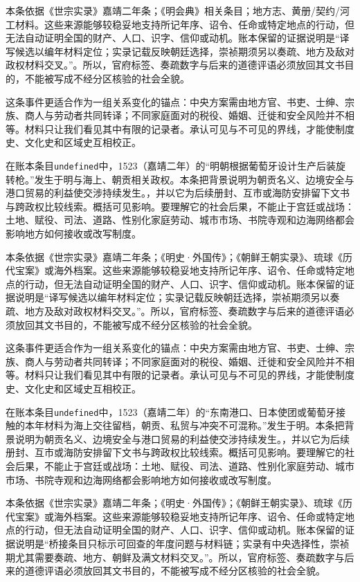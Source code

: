 本条依据《世宗实录》嘉靖二年条；《明会典》相关条目；地方志、黄册/契约/河工材料。这些来源能够较稳妥地支持所记年序、诏令、任命或特定地点的行动，但无法自动证明全国的财产、人口、识字、信仰或动机。账本保留的证据说明是“译写候选以编年材料定位；实录记载反映朝廷选择，崇祯期须另以奏疏、地方及敌对政权材料交叉。”。所以，官府标签、奏疏数字与后来的道德评语必须放回其文书目的，不能被写成不经分区核验的社会全貌。

这条事件更适合作为一组关系变化的锚点：中央方案需由地方官、书吏、士绅、宗族、商人与劳动者共同转译；不同家庭面对的税役、婚姻、迁徙和安全风险并不相等。材料只让我们看见其中有限的记录者。承认可见与不可见的界线，才能使制度史、文化史和区域史互相校正。

在账本条目\texttt{undefined}中，1523（嘉靖二年）的“明朝根据葡萄牙设计生产后装旋转枪。”发生于明与海上、朝贡相关政权。本条把背景说明为朝贡名义、边境安全与港口贸易的利益使交涉持续发生。，并以它为后续册封、互市或海防安排留下文书与跨政权比较线索。概括可见影响。要理解它的社会后果，不能止于宫廷或战场：土地、赋役、司法、道路、性别化家庭劳动、城市市场、书院寺观和边海网络都会影响地方如何接收或改写制度。

本条依据《世宗实录》嘉靖二年条；《明史·外国传》；《朝鲜王朝实录》、琉球《历代宝案》或海外档案。这些来源能够较稳妥地支持所记年序、诏令、任命或特定地点的行动，但无法自动证明全国的财产、人口、识字、信仰或动机。账本保留的证据说明是“译写候选以编年材料定位；实录记载反映朝廷选择，崇祯期须另以奏疏、地方及敌对政权材料交叉。”。所以，官府标签、奏疏数字与后来的道德评语必须放回其文书目的，不能被写成不经分区核验的社会全貌。

这条事件更适合作为一组关系变化的锚点：中央方案需由地方官、书吏、士绅、宗族、商人与劳动者共同转译；不同家庭面对的税役、婚姻、迁徙和安全风险并不相等。材料只让我们看见其中有限的记录者。承认可见与不可见的界线，才能使制度史、文化史和区域史互相校正。

在账本条目\texttt{undefined}中，1523（嘉靖二年）的“东南港口、日本使团或葡萄牙接触的本年材料为海上交往留档，朝贡、私贸与冲突不可混称。”发生于明。本条把背景说明为朝贡名义、边境安全与港口贸易的利益使交涉持续发生。，并以它为后续册封、互市或海防安排留下文书与跨政权比较线索。概括可见影响。要理解它的社会后果，不能止于宫廷或战场：土地、赋役、司法、道路、性别化家庭劳动、城市市场、书院寺观和边海网络都会影响地方如何接收或改写制度。

本条依据《世宗实录》嘉靖二年条；《明史·外国传》；《朝鲜王朝实录》、琉球《历代宝案》或海外档案。这些来源能够较稳妥地支持所记年序、诏令、任命或特定地点的行动，但无法自动证明全国的财产、人口、识字、信仰或动机。账本保留的证据说明是“桥接条目只标示可回查的年度问题与材料链；实录有中央选择性，崇祯期尤其需要奏疏、地方、朝鲜及满文材料交叉。”。所以，官府标签、奏疏数字与后来的道德评语必须放回其文书目的，不能被写成不经分区核验的社会全貌。

